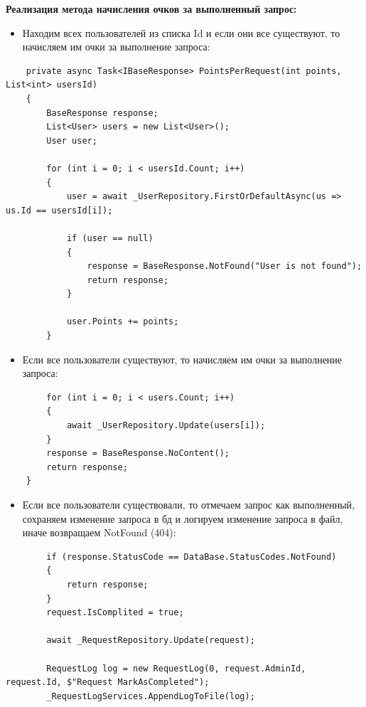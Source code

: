 \textbf{Реализация метода начисления очков за выполненный запрос:}
\begin{itemize}
	\item{Находим всех пользователей из списка Id и если они все существуют, то начисляем им очки за выполнение запроса:}
\end{itemize}
\begin{verbatim}
    private async Task<IBaseResponse> PointsPerRequest(int points, List<int> usersId)
    {
        BaseResponse response;
        List<User> users = new List<User>();
        User user;

        for (int i = 0; i < usersId.Count; i++)
        {
            user = await _UserRepository.FirstOrDefaultAsync(us => us.Id == usersId[i]);

            if (user == null)
            {
                response = BaseResponse.NotFound("User is not found");
                return response;
            }

            user.Points += points;
        }
\end{verbatim}

\begin{itemize}
	\item{Если все пользователи существуют, то начисляем им очки за выполнение запроса:}
\end{itemize}
\begin{verbatim}
        for (int i = 0; i < users.Count; i++)
        {
            await _UserRepository.Update(users[i]);
        }
        response = BaseResponse.NoContent();
        return response;
    }
\end{verbatim}

\begin{itemize}
	\item{Если все пользователи существовали, то отмечаем запрос как выполненный, сохраняем изменение запроса в бд и логируем изменение запроса в файл, иначе возвращаем NotFound (404):}
\end{itemize}
\begin{verbatim}
        if (response.StatusCode == DataBase.StatusCodes.NotFound)
        {
            return response;
        }
        request.IsComplited = true;

        await _RequestRepository.Update(request);

        RequestLog log = new RequestLog(0, request.AdminId, request.Id, $"Request MarkAsCompleted");
        _RequestLogServices.AppendLogToFile(log);
\end{verbatim}

